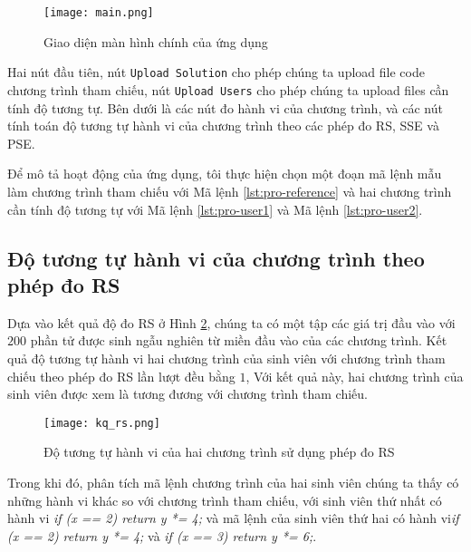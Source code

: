 \begin{figure}[H]
	\caption{Giao diện màn hình chính của ứng dụng}
	\label{fig:frmMain}
	\begin{center}
	 \texttt{[image: main.png]}
	\end{center}
\end{figure}

Hai nút đầu tiên, nút \texttt{Upload Solution} cho phép chúng ta upload file code chương trình tham chiếu, nút \texttt{Upload Users} cho phép chúng ta upload files cần tính độ tương tự. Bên dưới là các nút đo hành vi của chương trình, và các nút tính toán độ tương tự hành vi của chương trình theo các phép đo RS, SSE và PSE.

Để mô tả hoạt động của ứng dụng, tôi thực hiện chọn một đoạn mã lệnh mẫu làm chương trình tham chiếu với Mã lệnh \ref{lst:pro-reference} và hai chương trình cần tính độ tương tự với Mã lệnh \ref{lst:pro-user1} và Mã lệnh \ref{lst:pro-user2}.






\subsection{Độ tương tự hành vi của chương trình theo phép đo RS}
Dựa vào kết quả độ đo RS ở Hình \ref{fig:result-RS}, chúng ta có một tập các giá trị đầu vào với $ 200 $ phần tử được sinh ngẫu nghiên từ miền đầu vào của các chương trình. Kết quả độ tương tự hành vi hai chương trình của sinh viên với chương trình tham chiếu theo phép đo RS lần lượt đều bằng $ 1 $, Với kết quả này, hai chương trình của sinh viên được xem là tương đương với chương trình tham chiếu. 

\begin{figure}[H]
	\caption{Độ tương tự hành vi của hai chương trình sử dụng phép đo RS}
	\label{fig:result-RS}
	\begin{center}
		\texttt{[image: kq\_rs.png]}
	\end{center}
\end{figure}


Trong khi đó, phân tích mã lệnh chương trình của hai sinh viên chúng ta thấy có những hành vi khác so với chương trình tham chiếu, với sinh viên thứ nhất có hành vi \textit{if (x == 2) return y *= 4;} và mã lệnh của sinh viên thứ hai có hành vi\textit{if (x == 2) return y *= 4;} và \textit{if (x == 3) return y *= 6;}.

